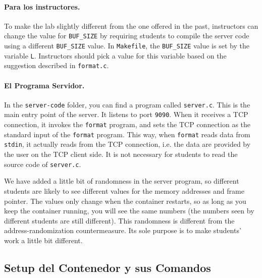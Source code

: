 \paragraph{Para los instructores.} 
To make the lab slightly different from the one offered in the past,
instructors can change the value for \texttt{BUF\_SIZE} by requiring
students to compile the server code using a different \texttt{BUF\_SIZE} value.
In \texttt{Makefile}, the \texttt{BUF\_SIZE} value is set by
the variable \texttt{L}. Instructors should pick a value for 
this variable based on the suggestion described in \texttt{format.c}.


\paragraph{El Programa Servidor.}
In the \texttt{server-code} folder, you can find a program called \texttt{server.c}.
This is the main entry point of the server. It listens to port \texttt{9090}.
When it receives a TCP connection, it
invokes the \texttt{format} program, and sets the TCP connection
as the standard input of the \texttt{format} program. This way,
when \texttt{format} reads data from \texttt{stdin}, it actually
reads from the TCP connection, i.e. the data are provided by
the user on the TCP client side. It is not necessary for
students to read the source code of \texttt{server.c}.

We have added a little bit of randomness
in the server program, so different students are likely to see different values
for the memory addresses and frame pointer. The values only change
when the container restarts, so as long as you keep the
container running, you will see the same numbers (the numbers
seen by different students are still different). This randomness
is different from the address-randomization countermeasure. Its sole
purpose is to make students' work a little bit different.


\subsection{Setup del Contenedor y sus Comandos}




